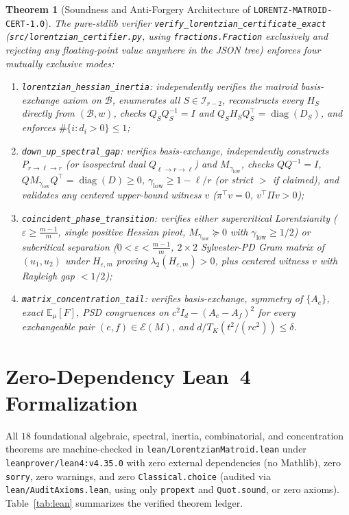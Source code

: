 \documentclass[11pt,a4paper]{article}
\newtheorem{theorem}{Theorem}[section]
\theoremstyle{definition}
\theoremstyle{remark}
\newcommand{\diag}{\operatorname{diag}}
\newcommand{\certschema}{\texttt{LORENTZ-MATROID-CERT-1.0}}
\begin{document}
\begin{theorem}[Soundness and Anti-Forgery Architecture of \certschema{}]\label{thm:verifier}
The pure-stdlib verifier \texttt{verify\_lorentzian\_certificate\_exact} (\texttt{src/lorentzian\_certifier.py}, using \texttt{fractions.Fraction} exclusively and rejecting any floating-point value anywhere in the JSON tree) enforces four mutually exclusive modes:
\begin{enumerate}[leftmargin=1.8em,itemsep=2pt]
  \item \texttt{lorentzian\_hessian\_inertia}: independently verifies the matroid basis-exchange axiom on $\mathcal{B}$, enumerates all $S \in \mathcal{I}_{r-2}$, reconstructs every $H_S$ directly from $(\mathcal{B}, w)$, checks $Q_S Q_S^{-1} = I$ and $Q_S H_S Q_S^\top = \diag(D_S)$, and enforces $\#\{i : d_i > 0\} \le 1$;
  \item \texttt{down\_up\_spectral\_gap}: verifies basis-exchange, independently constructs $P_{r\to\ell\to r}$ (or isospectral dual $Q_{\ell\to r\to\ell}$) and $M_{\gamma_{\mathrm{low}}}$, checks $Q Q^{-1} = I$, $Q M_{\gamma_{\mathrm{low}}} Q^\top = \diag(D) \ge 0$, $\gamma_{\mathrm{low}} \ge 1 - \ell/r$ (or strict $>$ if claimed), and validates any centered upper-bound witness $v$ ($\pi^\top v = 0$, $v^\top \Pi v > 0$);
  \item \texttt{coincident\_phase\_transition}: verifies either supercritical Lorentzianity ($\varepsilon \ge \frac{m-1}{m}$, single positive Hessian pivot, $M_{\gamma_{\mathrm{low}}} \succeq 0$ with $\gamma_{\mathrm{low}} \ge 1/2$) or subcritical separation ($0 < \varepsilon < \frac{m-1}{m}$, $2\times 2$ Sylvester-PD Gram matrix of $(u_1, u_2)$ under $H_{\varepsilon,m}$ proving $\lambda_2(H_{\varepsilon,m}) > 0$, plus centered witness $v$ with Rayleigh gap $< 1/2$);
  \item \texttt{matrix\_concentration\_tail}: verifies basis-exchange, symmetry of $\{A_e\}$, exact $\mathbb{E}_\mu[F]$, PSD congruences on $c^2 I_d - (A_e - A_f)^2$ for every exchangeable pair $(e, f) \in \mathcal{E}(M)$, and $d / T_K(t^2/(r c^2)) \le \delta$.
\end{enumerate}
\end{theorem}

\section{Zero-Dependency Lean~4 Formalization}\label{sec:lean}

All $18$ foundational algebraic, spectral, inertia, combinatorial, and concentration theorems are machine-checked in \texttt{lean/LorentzianMatroid.lean} under \texttt{leanprover/lean4:v4.35.0} with zero external dependencies (no Mathlib), zero \texttt{sorry}, zero warnings, and zero \texttt{Classical.choice} (audited via \texttt{lean/AuditAxioms.lean}, using only \texttt{propext} and \texttt{Quot.sound}, or zero axioms). Table~\ref{tab:lean} summarizes the verified theorem ledger.
\end{document}
